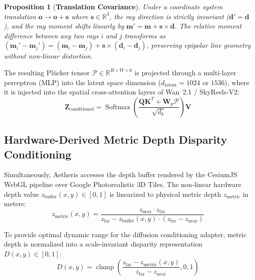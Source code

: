 \documentclass[10pt,twocolumn,letterpaper]{article}
\newtheorem{proposition}{Proposition}
\begin{document}
\begin{proposition}[\textbf{Translation Covariance}]
Under a coordinate system translation $\mathbf{o} \to \mathbf{o} + \mathbf{s}$ where $\mathbf{s} \in \mathbb{R}^3$, the ray direction is strictly invariant ($\mathbf{d}' = \mathbf{d}$), and the ray moment shifts linearly by $\mathbf{m}' = \mathbf{m} + \mathbf{s} \times \mathbf{d}$. The relative moment difference between any two rays $i$ and $j$ transforms as $(\mathbf{m}_i' - \mathbf{m}_j') = (\mathbf{m}_i - \mathbf{m}_j) + \mathbf{s} \times (\mathbf{d}_i - \mathbf{d}_j)$, preserving epipolar line geometry without non-linear distortion.
\end{proposition}

The resulting Pl\"ucker tensor $\mathcal{P} \in \mathbb{R}^{H \times W \times 6}$ is projected through a multi-layer perceptron (MLP) into the latent space dimension ($d_{\text{latent}} = 1024$ or $1536$), where it is injected into the spatial cross-attention layers of Wan~2.1 / SkyReels-V2:
\begin{equation}
\mathbf{Z}_{\text{conditioned}} = \operatorname{Softmax}\left(\frac{\mathbf{Q} \mathbf{K}^T + \mathbf{W}_p \mathcal{P}}{\sqrt{d_k}}\right) \mathbf{V}
\end{equation}

\subsection{Hardware-Derived Metric Depth Disparity Conditioning}

Simultaneously, Aetheris accesses the depth buffer rendered by the CesiumJS WebGL pipeline over Google Photorealistic 3D Tiles. The non-linear hardware depth value $z_{\text{buffer}}(x, y) \in [0, 1]$ is linearized to physical metric depth $z_{\text{metric}}$ in meters:
\begin{equation}
z_{\text{metric}}(x, y) = \frac{z_{\text{near}} \cdot z_{\text{far}}}{z_{\text{far}} - z_{\text{buffer}}(x, y) \cdot (z_{\text{far}} - z_{\text{near}})}
\end{equation}

To provide optimal dynamic range for the diffusion conditioning adapter, metric depth is normalized into a scale-invariant disparity representation $D(x, y) \in [0, 1]$:
\begin{equation}
D(x, y) = \operatorname{clamp}\left(\frac{z_{\text{far}} - z_{\text{metric}}(x, y)}{z_{\text{far}} - z_{\text{near}}}, 0, 1\right)
\end{equation}
\end{document}
